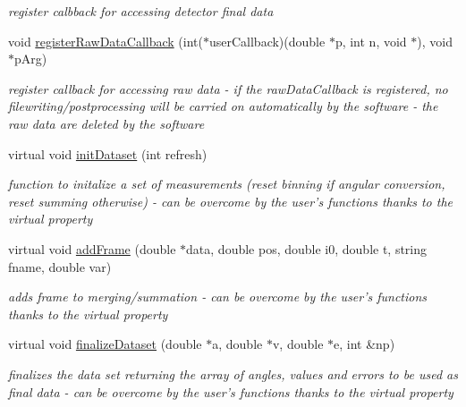 \begin{CompactItemize}
\begin{CompactList}\small\item\em register calbback for accessing detector final data \item\end{CompactList}\item 
void \hyperlink{classslsDetectorUsers_898cf0db148f0d3de7d4725cc8342c56}{register\-Raw\-Data\-Callback} (int($\ast$user\-Callback)(double $\ast$p, int n, void $\ast$), void $\ast$p\-Arg)
\begin{CompactList}\small\item\em register callback for accessing raw data - if the raw\-Data\-Callback is registered, no filewriting/postprocessing will be carried on automatically by the software - the raw data are deleted by the software \item\end{CompactList}\item 
virtual void \hyperlink{classslsDetectorUsers_56fa8890298a01fc58baad413dfdf1c1}{init\-Dataset} (int refresh)
\begin{CompactList}\small\item\em function to initalize a set of measurements (reset binning if angular conversion, reset summing otherwise) - can be overcome by the user's functions thanks to the virtual property \item\end{CompactList}\item 
virtual void \hyperlink{classslsDetectorUsers_5128e295a5b926ccabdb48083d324789}{add\-Frame} (double $\ast$data, double pos, double i0, double t, string fname, double var)
\begin{CompactList}\small\item\em adds frame to merging/summation - can be overcome by the user's functions thanks to the virtual property \item\end{CompactList}\item 
virtual void \hyperlink{classslsDetectorUsers_9cbe00dac8a19b71de88ebbdf3b0ea29}{finalize\-Dataset} (double $\ast$a, double $\ast$v, double $\ast$e, int \&np)
\begin{CompactList}\small\item\em finalizes the data set returning the array of angles, values and errors to be used as final data - can be overcome by the user's functions thanks to the virtual property \item\end{CompactList}\item 

\end{CompactItemize}
